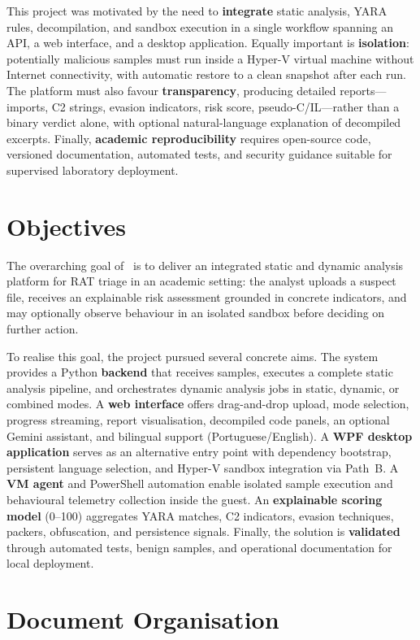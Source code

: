 This project was motivated by the need to \textbf{integrate} static analysis, YARA rules,
decompilation, and sandbox execution in a single workflow spanning an API, a web interface, and
a desktop application. Equally important is \textbf{isolation}: potentially malicious samples
must run inside a Hyper-V virtual machine without Internet connectivity, with automatic restore
to a clean snapshot after each run. The platform must also favour \textbf{transparency}, producing
detailed reports---imports, C2 strings, evasion indicators, risk score, pseudo-C/IL---rather than
a binary verdict alone, with optional natural-language explanation of decompiled excerpts. Finally,
\textbf{academic reproducibility} requires open-source code, versioned documentation, automated
tests, and security guidance suitable for supervised laboratory deployment.

\section{Objectives}

The overarching goal of \rat\ is to deliver an integrated static and dynamic analysis platform
for RAT triage in an academic setting: the analyst uploads a suspect file, receives an
explainable risk assessment grounded in concrete indicators, and may optionally observe behaviour
in an isolated sandbox before deciding on further action.

To realise this goal, the project pursued several concrete aims. The system provides a Python
\textbf{backend} that receives samples, executes a complete static analysis pipeline, and
orchestrates dynamic analysis jobs in static, dynamic, or combined modes. A \textbf{web interface}
offers drag-and-drop upload, mode selection, progress streaming, report visualisation, decompiled
code panels, an optional Gemini assistant, and bilingual support (Portuguese/English). A
\textbf{WPF desktop application} serves as an alternative entry point with dependency bootstrap,
persistent language selection, and Hyper-V sandbox integration via Path~B. A \textbf{VM agent} and
PowerShell automation enable isolated sample execution and behavioural telemetry collection inside
the guest. An \textbf{explainable scoring model} (0--100) aggregates YARA matches, C2 indicators,
evasion techniques, packers, obfuscation, and persistence signals. Finally, the solution is
\textbf{validated} through automated tests, benign samples, and operational documentation for
local deployment.

\section{Document Organisation}

